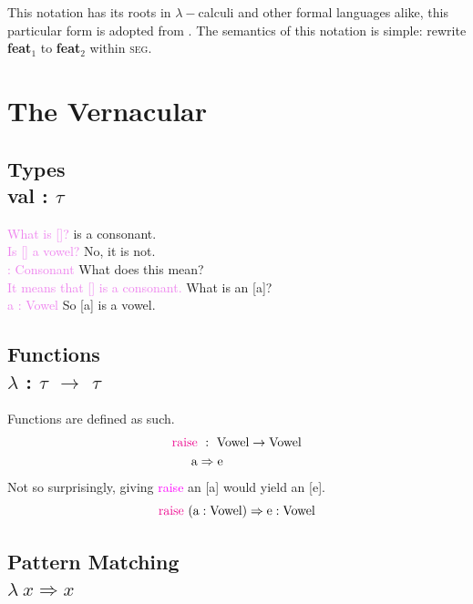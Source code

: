 \documentclass{report}[12pt]
\begin{document}
This notation has its roots in $\lambda-$calculi and other formal languages alike, this particular form is adopted from \cite{tpl}. The semantics of this notation is simple: rewrite \textbf{feat}$_1$ to \textbf{feat}$_2$ within \textsc{seg}.

\section{The Vernacular}

\subsection*{Types \\ val : $\tau$}

\begin{tcolorbox}
  \textcolor{violet}{What is []?} \quad [\textipa{S}] is a consonant. \\
  \textcolor{violet}{Is [] a vowel?} \quad No, it is not. \\
  \textcolor{violet}{ : Consonant} \quad What does this mean? \\
  \textcolor{violet}{It means that [] is a consonant.} \quad What is an [a]? \\
  \textcolor{violet}{a : Vowel} \quad So [a] is a vowel. \\
\end{tcolorbox}

\subsection*{Functions \\ $\lambda$ : $\tau$ $\rightarrow$ $\tau$}

Functions are defined as such.
\begin{align*}
\text{\textcolor{magenta}{raise}} &\ :\ \text{Vowel} \rightarrow \text{Vowel} \\
\text{a} & \Rightarrow \text{e} \\
\end{align*}
Not so surprisingly, giving \textcolor{magenta}{raise} an [a] would yield an [e].
\[ \text{\textcolor{magenta}{raise}}\ (\text{a} : \text{Vowel}) \Rightarrow \text{e} : \text{Vowel} \]

\subsection*{Pattern Matching \\ $\lambda\ x \Rightarrow x$}
\end{document}
